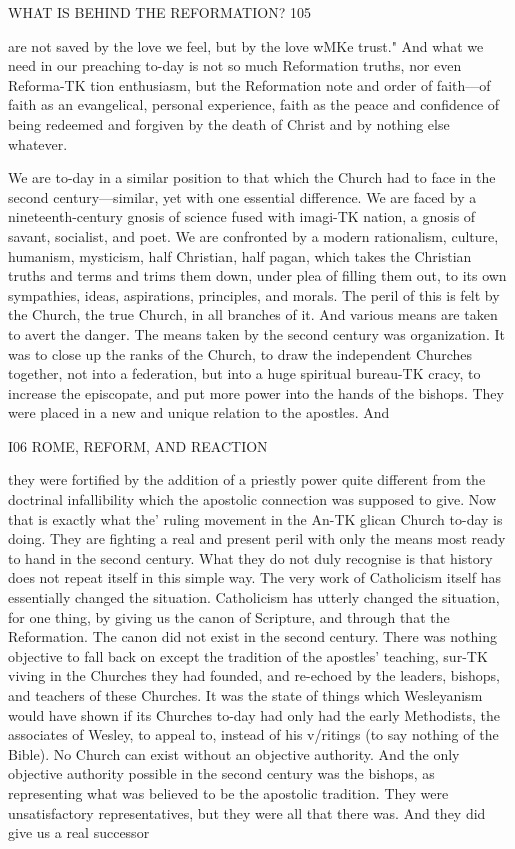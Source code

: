 \documentclass[12pt,a5paper,oneside]{book}
\begin{document}
WHAT IS BEHIND THE REFORMATION? 105 

are not saved by the love we feel, but by the love wMKe 
trust." And what we need in our preaching to-day is 
not so much Reformation truths, nor even Reforma-TK
tion enthusiasm, but the Reformation note and order of 
faith---of faith as an evangelical, personal experience, 
faith as the peace and confidence of being redeemed 
and forgiven by the death of Christ and by nothing 
else whatever. 

We are to-day in a similar position to that which 
the Church had to face in the second century---similar, 
yet with one essential difference. We are faced by a 
nineteenth-century gnosis of science fused with imagi-TK
nation, a gnosis of savant, socialist, and poet. We are 
confronted by a modern rationalism, culture, humanism, 
mysticism, half Christian, half pagan, which takes the 
Christian truths and terms and trims them down, 
under plea of filling them out, to its own sympathies, 
ideas, aspirations, principles, and morals. The peril 
of this is felt by the Church, the true Church, in all 
branches of it. And various means are taken to avert 
the danger. The means taken by the second century 
was organization. It was to close up the ranks of the 
Church, to draw the independent Churches together, 
not into a federation, but into a huge spiritual bureau-TK
cracy, to increase the episcopate, and put more power 
into the hands of the bishops. They were placed 
in a new and unique relation to the apostles. And 



I06 ROME, REFORM, AND REACTION 

they were fortified by the addition of a priestly power 
quite different from the doctrinal infallibility which 
the apostolic connection was supposed to give. Now 
that is exactly what the' ruling movement in the An-TK
glican Church to-day is doing. They are fighting a 
real and present peril with only the means most ready 
to hand in the second century. What they do not duly 
recognise is that history does not repeat itself in this 
simple way. The very work of Catholicism itself has 
essentially changed the situation. Catholicism has 
utterly changed the situation, for one thing, by giving 
us the canon of Scripture, and through that the 
Reformation. The canon did not exist in the second 
century. There was nothing objective to fall back 
on except the tradition of the apostles' teaching, sur-TK
viving in the Churches they had founded, and re-echoed 
by the leaders, bishops, and teachers of these Churches. 
It was the state of things which Wesleyanism would 
have shown if its Churches to-day had only had the 
early Methodists, the associates of Wesley, to appeal 
to, instead of his v/ritings (to say nothing of the 
Bible). No Church can exist without an objective 
authority. And the only objective authority possible 
in the second century was the bishops, as representing 
what was believed to be the apostolic tradition. They 
were unsatisfactory representatives, but they were all 
that there was. And they did give us a real successor 
\end{document}

